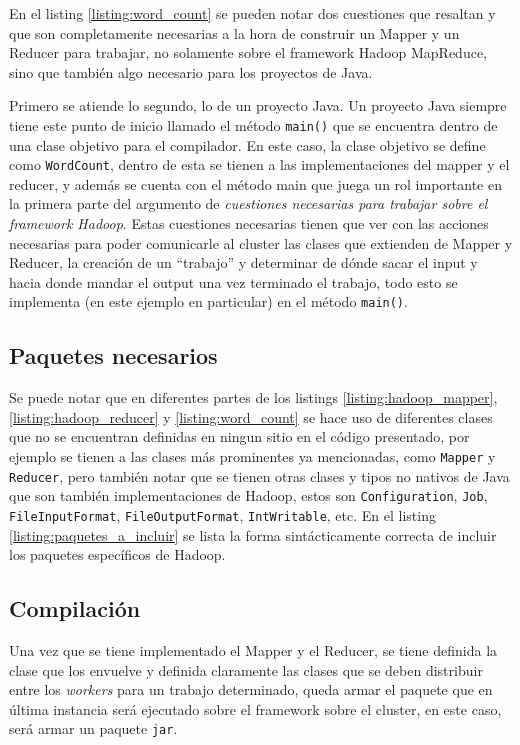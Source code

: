 En el listing \ref{listing:word_count} se pueden notar dos cuestiones que
resaltan y que son completamente necesarias a la hora de construir un Mapper y
un Reducer para trabajar, no solamente sobre el \Gls{framework} Hadoop
MapReduce, sino que también algo necesario para los proyectos de Java.

Primero se atiende lo segundo, lo de un proyecto Java. Un proyecto Java siempre
tiene este punto de inicio llamado el método {\tt main()} que se encuentra
dentro de una clase objetivo para el compilador. En este caso, la clase
objetivo se define como {\tt WordCount}, dentro de esta se tienen a las
implementaciones del mapper y el reducer, y además se cuenta con el método
main que juega un rol importante en la primera parte del argumento de
{\it cuestiones necesarias para trabajar sobre el \gls{framework} Hadoop}.
Estas cuestiones necesarias tienen que ver con las acciones necesarias para
poder comunicarle al cluster las clases que extienden de Mapper y Reducer, la
creación de un ``trabajo'' y determinar de dónde sacar el input y hacia donde
mandar el output una vez terminado el trabajo, todo esto se implementa (en este
ejemplo en particular) en el método {\tt main()}.

\subsection*{Paquetes necesarios}
Se puede notar que en diferentes partes de los listings
\ref{listing:hadoop_mapper}, \ref{listing:hadoop_reducer} y
\ref{listing:word_count} se hace uso de diferentes clases que no se encuentran
definidas en ningun sitio en el código presentado, por ejemplo se tienen a las
clases más prominentes ya mencionadas, como {\tt Mapper} y {\tt Reducer}, pero
también notar que se tienen otras clases y tipos no nativos de Java que son
también implementaciones
de Hadoop, estos son {\tt Configuration}, {\tt Job}, {\tt FileInputFormat},
{\tt FileOutputFormat}, {\tt IntWritable}, etc. En el listing
\ref{listing:paquetes_a_incluir} se lista la forma sintácticamente correcta de
incluir los paquetes específicos de Hadoop.



\subsection*{Compilación}
Una vez que se tiene implementado el Mapper y el Reducer, se tiene definida la
clase que los envuelve y definida claramente las clases que se deben distribuir 
entre los {\it workers} para un trabajo determinado,
queda armar el paquete que en última instancia será ejecutado sobre el
\gls{framework} sobre el \gls{cluster}, en este caso, será armar un paquete
{\tt \acrshort{jar}}.


